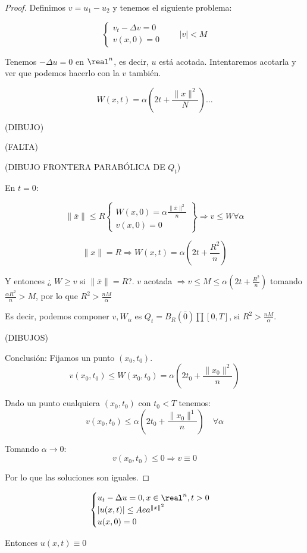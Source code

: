 			\begin{proof}
				Definimos $v = u_1 -u_2$ y tenemos el siguiente problema:

				\[\begin{cases}
					v_t - \Delta v = 0\\
					v(x,0) = 0
				\end{cases}  \quad\quad |v| < M\]

				Tenemos $-\Delta u = 0$ en $\real^n$, es decir, $u$ está acotada. Intentaremos acotarla y ver que podemos hacerlo con la $v$ también.

				\[ W(x,t) = \alpha (2t + \frac{\| x\|^2}{N}) …\]

				(DIBUJO)

				(FALTA)

				(DIBUJO FRONTERA PARABÓLICA DE $Q_t$)

				En $t=0$:

				\[ \|\bar{x}\| \leq R \left. \begin{cases}
					W(x,0) = \alpha \frac{\|\bar{x}\|^2}{n}\\
					v(x,0) = 0
				\end{cases}\right\} \Rightarrow v \leq W \forall \alpha \]

				\[ \|x\| = R \Rightarrow W(x,t) = \alpha(2t+\frac{R^2}{n}) \]

				Y entonces ¿ $W \geq v$ si $\|\bar{x}\| = R$?. $v$ acotada $\Rightarrow v \leq M \leq \alpha (2t + \frac{R^2}{n})$ tomando $\frac{\alpha R^2}{n} > M$, por lo que $R^2 > \frac{nM}{\alpha}$

				Es decir, podemos componer $v, W_\alpha$ es $Q_t = B_R(\bar{0}) \prod [0,T]$, si $R^2 > \frac{nM}{\alpha}$.

				(DIBUJOS)

				Conclusión: Fijamos un punto $(x_0,t_0)$.
					\[v(x_0,t_0) \leq W(x_0,t_0) = \alpha (2t_0+ \frac{\|x_0\|^2}{n})\]

				Dado un punto cualquiera $(x_0,t_0)$ con $t_0 < T$ tenemos:
				\[ v(x_0,t_0) \leq \alpha (2 t_0 + \frac{\|x_0\|^1}{n}) \quad \forall \alpha\]

				Tomando $\alpha \rightarrow 0$:
				\[v(x_0,t_0) \leq 0 \Rightarrow v \equiv 0\]

				Por lo que las soluciones son iguales.

			\end{proof}

			\begin{theorem}
				\[\begin{cases}
					u_t - \Delta u = 0, x \in \real^n, t>0 \\
					|u(x,t)| \leq A ea^{\|x\|^2} \\
					u(x,0) = 0
				\end{cases}\]

				Entonces $u(x,t) \equiv 0$

			\end{theorem}

